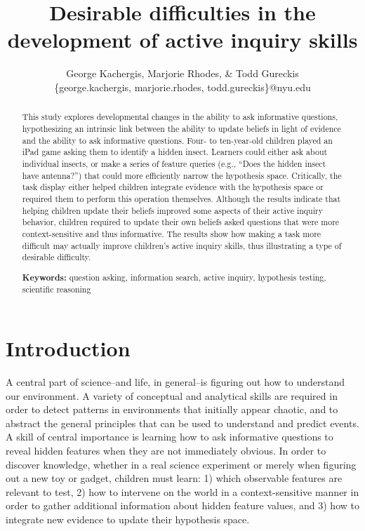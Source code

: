 \documentclass[man,floatsintext]{apa6}
\title{Desirable difficulties in the development of active inquiry skills}
\author{
 George Kachergis, Marjorie Rhodes, \& Todd Gureckis \\
  \{george.kachergis, marjorie.rhodes, todd.gureckis\}@nyu.edu \\
}
\affiliation{Department of Psychology \\
   New York University \\
  New York, NY
  }
\begin{document}
\maketitle

\begin{abstract}

This study explores developmental changes in the ability to ask 
informative questions, hypothesizing an intrinsic link between the ability to 
update beliefs in light of evidence and the ability to ask informative questions. 
Four- to ten-year-old children 
played an iPad game asking them to identify a hidden insect. Learners could either 
ask about individual insects, or make a series of feature queries (e.g., ``Does the 
hidden insect have antenna?'') that could more efficiently narrow the hypothesis 
space. Critically, the task display either helped children integrate evidence 
with the hypothesis space or required them to perform this operation themselves.  Although the results 
indicate that helping children update their beliefs improved some aspects of their active 
inquiry behavior, children required to update their own beliefs asked questions that 
were more context-sensitive and thus informative.  The results show how making a 
task more difficult may actually improve children's active inquiry skills, thus 
illustrating a type of desirable difficulty.

\textbf{Keywords:} 
question asking, information search, active inquiry, hypothesis testing, scientific 
reasoning
\end{abstract}


\section{Introduction} 

A central part of science--and life, in general--is figuring out how to understand our environment. 
A variety of conceptual and analytical skills are required in order to detect patterns in 
environments that initially appear chaotic, and to abstract the general principles that can 
be used to understand and predict events. A skill of central importance is learning how to ask 
informative questions to reveal hidden features when they are not immediately obvious.
In order to discover knowledge, whether in a real science experiment or 
merely when figuring out a new toy or gadget, children must learn: 1) which 
observable features are relevant to test, 2) how to intervene on the world in a 
context-sensitive manner in order to gather additional information about hidden 
feature values, and 3) how to integrate new evidence to update their hypothesis space.
\end{document}
